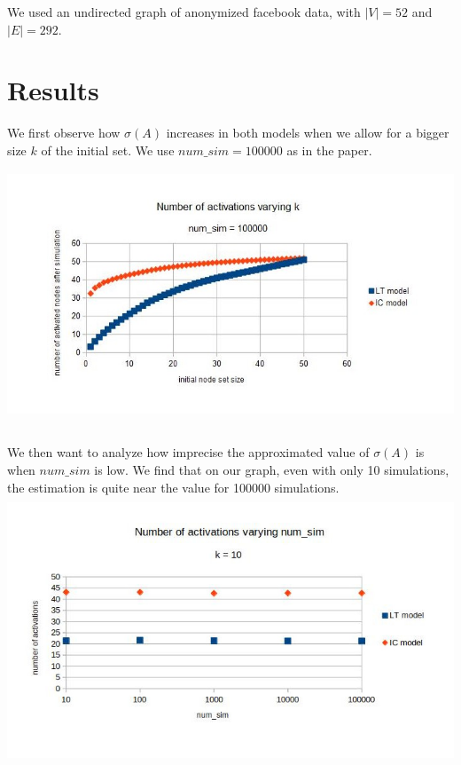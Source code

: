 \documentclass[paper=a4,fontsize=11pt,DIV=8,BCOR=5mm,twoside,pdftex]{scrartcl}
\begin{document}
We used an undirected graph of anonymized facebook data, with $|V| = 52$ and $|E| =292 $.

\section{Results}	
	
We first observe how $\sigma(A)$ increases in both models when we allow for a bigger size $k$ of the initial set. We use $num\_sim = 100000 $ as in the paper.\\

\includegraphics[height=8cm]{var_k.jpg}

We then want to analyze how imprecise the approximated value of $\sigma(A)$ is when $num\_sim$ is low. We find that on our graph, even with only 10 simulations, the estimation is quite near the value for 100000 simulations.\\

\includegraphics[height=8cm]{var_numsim.jpg}
\end{document}
